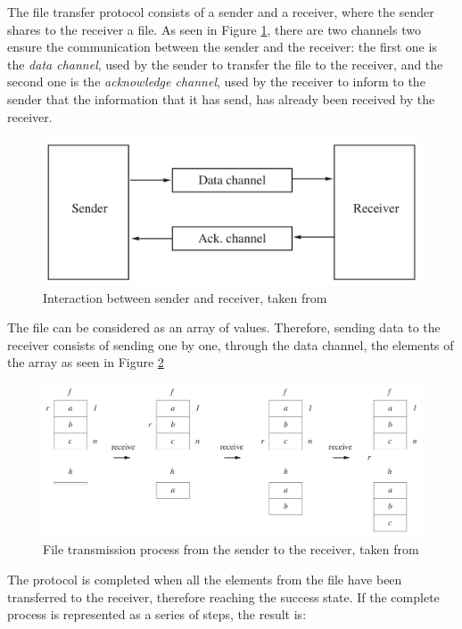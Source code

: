 The file transfer protocol consists of a sender and a receiver, where the sender shares to the receiver a file. As seen in Figure \ref{fig:cs5}, there are two channels two ensure the communication between the sender and the receiver: the first one is the \textit{data channel}, used by the sender to transfer the file to the receiver, and the second one is the \textit{acknowledge channel}, used by the receiver to inform to the sender that the information that it has send, has already been received by the receiver.
\begin{figure}[H]
    \centering
    \includegraphics[scale = 0.2]{images/CS5.png}
    \caption{Interaction between sender and receiver, taken from \cite{Abrial2011}}
    \label{fig:cs5}
\end{figure}
The file can be considered as an array of values. Therefore, sending data to the receiver consists of sending one by one, through the data channel, the elements of the array as seen in Figure \ref{fig:cs6}  
\begin{figure}[H]
    \centering
    \includegraphics[scale = 0.3]{images/CS6.png}
    \caption{File transmission process from the sender to the receiver, taken from \cite{Abrial2011}}
    \label{fig:cs6}
\end{figure}
The protocol is completed when all the elements from the file have been transferred to the receiver, therefore reaching the success state. If the complete process is represented as a series of steps, the result is:
